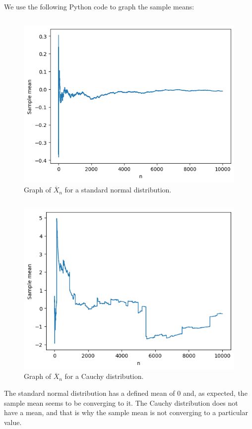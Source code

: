 \begin{ex}
  We use the following Python code to graph the sample means:

  \inputminted{python}{../code/03-09a.py}

  \begin{figure}[H]
    \centering
    \includegraphics[scale=0.9]{../images/03-09a}
    \caption{Graph of $\overline{X}_n$ for a standard normal distribution.}
  \end{figure}

  \inputminted{python}{../code/03-09b.py}

  \begin{figure}[H]
    \centering
    \includegraphics[scale=0.9]{../images/03-09b}
    \caption{Graph of $\overline{X}_n$ for a Cauchy distribution.}
  \end{figure}

  The standard normal distribution has a defined mean of $0$ and, as expected,
  the sample mean seems to be converging to it. The Cauchy distribution does not
  have a mean, and that is why the sample mean is not converging to a particular
  value.
\end{ex}

